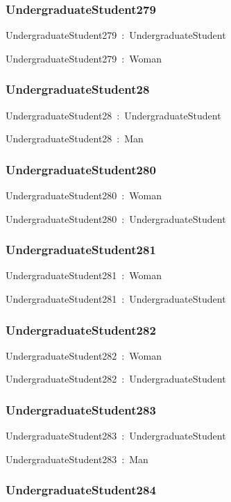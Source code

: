 \documentclass{article}
\begin{document}
\subsubsection*{UndergraduateStudent279}

UndergraduateStudent279~:~UndergraduateStudent

UndergraduateStudent279~:~Woman

\subsubsection*{UndergraduateStudent28}

UndergraduateStudent28~:~UndergraduateStudent

UndergraduateStudent28~:~Man

\subsubsection*{UndergraduateStudent280}

UndergraduateStudent280~:~Woman

UndergraduateStudent280~:~UndergraduateStudent

\subsubsection*{UndergraduateStudent281}

UndergraduateStudent281~:~Woman

UndergraduateStudent281~:~UndergraduateStudent

\subsubsection*{UndergraduateStudent282}

UndergraduateStudent282~:~Woman

UndergraduateStudent282~:~UndergraduateStudent

\subsubsection*{UndergraduateStudent283}

UndergraduateStudent283~:~UndergraduateStudent

UndergraduateStudent283~:~Man

\subsubsection*{UndergraduateStudent284}
\end{document}
